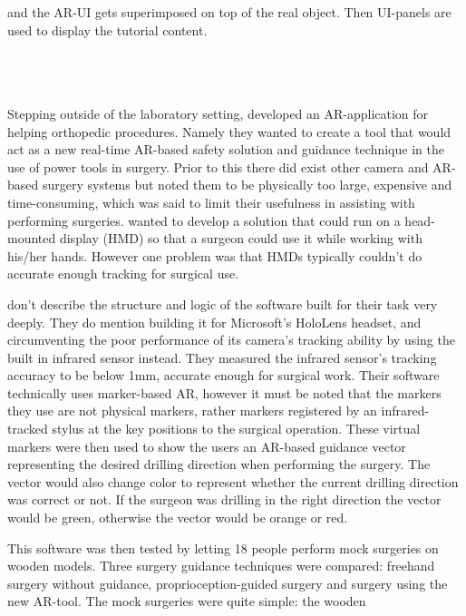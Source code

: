 and the AR-UI gets superimposed on top of the real object. Then UI-panels are 
used to display the tutorial content. \par
\\
\\
\\
Stepping outside of the laboratory setting, \textcite{VanGestel2024} developed 
an AR-application for helping orthopedic procedures. Namely they wanted to 
create a tool that would act as a new real-time AR-based safety solution and 
guidance technique in the use of power tools in surgery. Prior to this there 
did exist other camera and AR-based surgery systems but 
\textcite{VanGestel2024} noted them to be physically too large, expensive and 
time-consuming, which was said to limit their usefulness in assisting with 
performing surgeries. \textcite{VanGestel2024} wanted to develop a solution 
that could run on a head-mounted display (HMD) so that a surgeon could use 
it while working with his/her hands. However one problem was that HMDs 
typically couldn't do accurate enough tracking for surgical 
use.\cite{VanGestel2024}\par
	\textcite{VanGestel2024} don't describe the structure and logic 
of the software built for their task very deeply. They do mention building it 
for Microsoft's HoloLens headset, and circumventing the poor performance of 
its camera's tracking ability by using the built in infrared sensor 
instead.\cite{VanGestel2024} They measured the infrared sensor's tracking 
accuracy to be below 1mm, accurate enough for surgical 
work.\cite{VanGestel2024} Their software technically uses marker-based AR, 
however it must be noted that the markers they use are not physical markers, 
rather markers registered by an infrared-tracked stylus at the key positions 
to the surgical operation.\cite{VanGestel2024} These virtual markers were then 
used to show the users an AR-based guidance vector representing the desired 
drilling direction when performing the surgery. The vector would also change 
color to represent whether the current drilling direction was correct or not. 
If the surgeon was drilling in the right direction the vector would be green, 
otherwise the vector would be orange or red.\cite{VanGestel2024}\par
	This software was then tested by letting 18 people perform mock 
surgeries on wooden models.\cite{VanGestel2024} Three surgery guidance 
techniques were compared: freehand surgery without guidance, 
proprioception-guided surgery and surgery using the new 
AR-tool.\cite{VanGestel2024} The mock surgeries were quite simple: the wooden 
